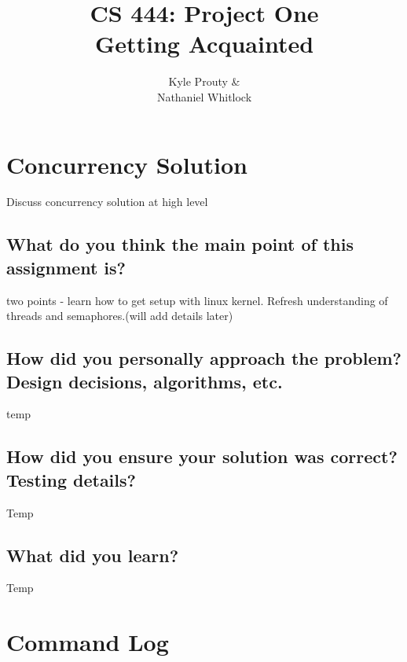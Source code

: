 \documentclass[a4paper]{article}
\title{CS 444: Project One\\\Large{Getting Acquainted}}
\author{Kyle Prouty \&\\Nathaniel Whitlock}
\begin{document}
\maketitle

\section{Concurrency Solution}
Discuss concurrency solution at high level

\subsection{What do you think the main point of this assignment is?}

two points - learn how to get setup with linux kernel. Refresh understanding of threads and semaphores.(will add details later)

\subsection{How did you personally approach the problem? Design decisions, algorithms, etc.}
temp

\subsection{How did you ensure your solution was correct? Testing details?}
Temp

\subsection{What did you learn?}
Temp

\section{Command Log}
\end{document}
